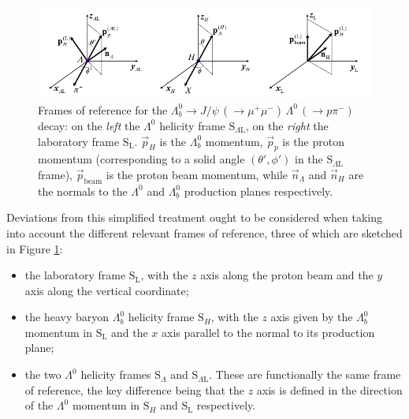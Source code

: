 \begin{figure}[t]
	\centering
	\includegraphics[scale=1]{graphics/01-standard_model/frames_of_reference.pdf}
	\caption[Frames of reference for the $\Lambda_b^0 \rightarrow J/\psi \, (\rightarrow \mu^+ \mu^-) \,\Lambda^0 \,(\rightarrow p \pi^-)$ decay.]{Frames of reference for the $\Lambda_b^0 \rightarrow J/\psi \, (\rightarrow \mu^+ \mu^-) \,\Lambda^0 \,(\rightarrow p \pi^-)$ decay: on the \textit{left} the $\Lambda^0$ helicity frame $\text{S}_{\Lambda\text{L}}$, on the \textit{right} the laboratory frame $\text{S}_{\text{L}}$.
	$\vec{p}_H$ is the $\Lambda_b^0$ momentum, $\vec{p}_p$ is the proton momentum (corresponding to a solid angle $(\theta',\phi')$ in the $\text{S}_{\Lambda\text{L}}$ frame), $\vec{p}_\text{beam}$ is the proton beam momentum, while $\vec{n}_\Lambda$ and $\vec{n}_H$ are the normals to the $\Lambda^0$ and $\Lambda^0_b$ production planes respectively.}
	\label{fig:frames_of_reference}
\end{figure}

Deviations from this simplified treatment ought to be considered when taking into account the different relevant frames of reference, three of which are sketched in Figure \ref{fig:frames_of_reference}:
\begin{itemize}
	\item the laboratory frame $\text{S}_\text{L}$, with the $z$ axis along the proton beam and the $y$ axis along the vertical coordinate;
	\item the heavy baryon $\Lambda_b^0$ helicity frame $\text{S}_H$, with the $z$ axis given by the $\Lambda_b^0$ momentum in $\text{S}_\text{L}$ and the $x$ axis parallel to the normal to its production plane;
	\item the two $\Lambda^0$ helicity frames $\text{S}_\Lambda$ and $\text{S}_{\Lambda \text{L}}$. These are functionally the same frame of reference, the key difference being that the $z$ axis is defined in the direction of the $\Lambda^0$ momentum in $\text{S}_H$ and $\text{S}_\text{L}$ respectively.
\end{itemize}

